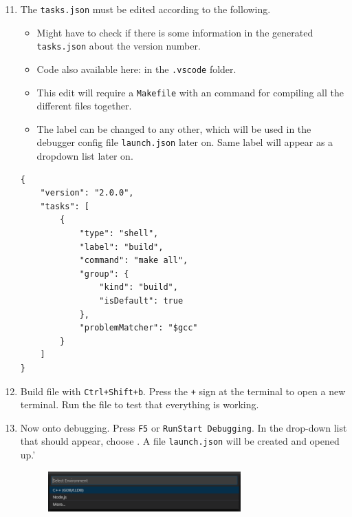 \begin{enumerate}
    \setcounter{enumi}{10}
    
    \item The \texttt{tasks.json} must be edited according to the following.
    
    \begin{itemize}
        \item Might have to check if there is some information in the generated \texttt{tasks.json} about the version number.
        
        \item Code also available here:  in the \texttt{.vscode} folder.
        
        \item This edit will require a \texttt{Makefile} with an  command for compiling all the different files together.
        
        \item The label  can be changed to any other, which will be used in the debugger config file \texttt{launch.json} later on. Same label will appear as a dropdown list later on.
    \end{itemize}

    \begin{verbatim}
{
    "version": "2.0.0",
    "tasks": [
        {
            "type": "shell",
            "label": "build",
            "command": "make all",
            "group": {
                "kind": "build",
                "isDefault": true
            },
            "problemMatcher": "$gcc"
        }
    ]
}
    \end{verbatim}

    \item Build file with \texttt{Ctrl+Shift+b}. Press the \texttt{+} sign at the terminal to open a new terminal. Run the file  to test that everything is working.
    
    \item Now onto debugging. Press \texttt{F5} or \texttt{Run\ra Start Debugging}. In the drop-down list that should appear, choose . A file \texttt{launch.json} will be created and opened up.'
    
    \begin{figure}[H]
        \centering
        \includegraphics[width=0.7\textwidth]{figures/vscode_debugger.PNG}
    \end{figure}


\end{enumerate}
